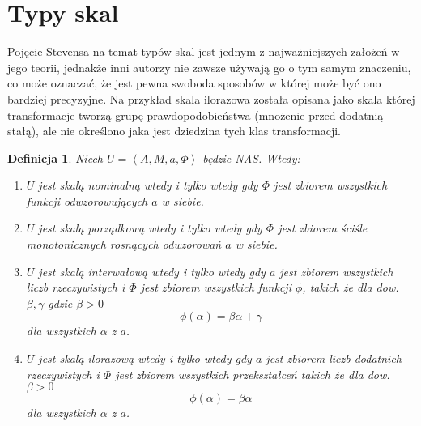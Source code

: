 \documentclass[12pt,a4paper]{report}
\newtheorem{definition}{Definicja}[chapter]
\newcommand{\tuple}[1]{\left\langle {#1} \right\rangle}
\begin{document}
\section{Typy skal}
Pojęcie Stevensa na temat typów skal jest jednym z najważniejszych założeń w jego teorii, jednakże inni autorzy nie zawsze używają go o tym samym znaczeniu, co może oznaczać, że jest pewna swoboda sposobów w której może być ono bardziej precyzyjne. Na przykład skala ilorazowa została opisana jako skala której transformacje tworzą grupę prawdopodobieństwa (mnożenie przed dodatnią stałą), ale nie określono jaka jest dziedzina tych klas transformacji.  
\begin{definition}
Niech $U=\tuple{A, M, a, \Phi}$ będzie NAS. Wtedy:
\begin{enumerate}
\item
$U$ jest skalą nominalną wtedy i tylko wtedy gdy $\Phi$ jest zbiorem wszystkich funkcji odwzorowujących $a$ w siebie.
\item
$U$ jest skalą porządkową wtedy i tylko wtedy gdy $\Phi$ jest zbiorem ściśle monotonicznych rosnących odwzorowań $a$ w siebie.
\item
$U$ jest skalą interwałową wtedy i tylko wtedy gdy $a$ jest zbiorem wszystkich liczb rzeczywistych i $\Phi$ jest zbiorem wszystkich funkcji $\phi$, takich że dla dow. $\beta,\gamma$ gdzie $\beta>0$
\begin{equation*}
\phi(\alpha)=\beta\alpha+\gamma
\end{equation*}
dla wszystkich $\alpha$ z $a$.
\item
$U$ jest skalą ilorazową wtedy i tylko wtedy gdy $a$ jest zbiorem liczb dodatnich rzeczywistych i $\Phi$ jest zbiorem wszystkich przekształceń takich że dla dow. $\beta>0$
\begin{equation*}
\phi(\alpha)=\beta\alpha
\end{equation*}
dla wszystkich $\alpha$ z $a$.
\end{enumerate}
\end{definition}
\end{document}
